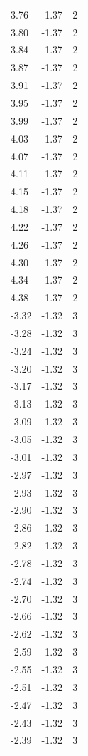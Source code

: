 \begin{longtable}{lrr}
  3.76 & -1.37 & 2 \\
  3.80 & -1.37 & 2 \\
  3.84 & -1.37 & 2 \\
  3.87 & -1.37 & 2 \\
  3.91 & -1.37 & 2 \\
  3.95 & -1.37 & 2 \\
  3.99 & -1.37 & 2 \\
  4.03 & -1.37 & 2 \\
  4.07 & -1.37 & 2 \\
  4.11 & -1.37 & 2 \\
  4.15 & -1.37 & 2 \\
  4.18 & -1.37 & 2 \\
  4.22 & -1.37 & 2 \\
  4.26 & -1.37 & 2 \\
  4.30 & -1.37 & 2 \\
  4.34 & -1.37 & 2 \\
  4.38 & -1.37 & 2 \\
  -3.32 & -1.32 & 3 \\
  -3.28 & -1.32 & 3 \\
  -3.24 & -1.32 & 3 \\
  -3.20 & -1.32 & 3 \\
  -3.17 & -1.32 & 3 \\
  -3.13 & -1.32 & 3 \\
  -3.09 & -1.32 & 3 \\
  -3.05 & -1.32 & 3 \\
  -3.01 & -1.32 & 3 \\
  -2.97 & -1.32 & 3 \\
  -2.93 & -1.32 & 3 \\
  -2.90 & -1.32 & 3 \\
  -2.86 & -1.32 & 3 \\
  -2.82 & -1.32 & 3 \\
  -2.78 & -1.32 & 3 \\
  -2.74 & -1.32 & 3 \\
  -2.70 & -1.32 & 3 \\
  -2.66 & -1.32 & 3 \\
  -2.62 & -1.32 & 3 \\
  -2.59 & -1.32 & 3 \\
  -2.55 & -1.32 & 3 \\
  -2.51 & -1.32 & 3 \\
  -2.47 & -1.32 & 3 \\
  -2.43 & -1.32 & 3 \\
  -2.39 & -1.32 & 3 \\

\end{longtable}
